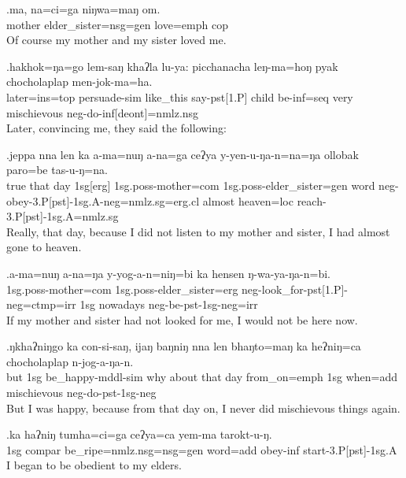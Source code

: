 \exg.ma,     na=ci=ga                 niŋwa=maŋ   om.\\
 mother elder\_sister{\sc =nsg=gen} love{\sc =emph} {\sc cop}\\
Of course my mother and my sister loved me.

\exg.hakhok=ŋa=go      lem-saŋ           khaʔla   lu-ya:  picchanacha leŋ-ma=hoŋ      pyak chocholaplap men-jok-ma=ha. \\
 later{\sc =ins=top}  persuade{\sc -sim} like\_this say{\sc -pst[1.P]} child       be{\sc -inf=seq}  very mischievous  {\sc neg-}do{\sc -inf[deont]=nmlz.nsg}\\
Later, convincing me, they said the following: 


\exg.jeppa nna  len ka       a-ma=nuŋ   a-na=ga  ceʔya y-yen-u-ŋa-n=na=ŋa   ollobak paro=be      tas-u-ŋ=na.\\
 true  that day {\sc 1sg[erg]} {\sc 1sg.poss-}mother{\sc =com} {\sc 1sg.poss-}elder\_sister{\sc =gen} word  {\sc neg-}obey{\sc -3.P[pst]-1sg.A-neg=nmlz.sg=erg.cl} almost     heaven{\sc =loc} reach{\sc -3.P[pst]-1sg.A=nmlz.sg}\\
Really, that day, because I did not listen to my mother and sister, I had almost gone to heaven. 

\exg.a-ma=nuŋ                a-na=ŋa                      y-yog-a-n=niŋ=bi                                ka  hensen   ŋ-wa-ya-ŋa-n=bi.\\
 {\sc 1sg.poss-}mother{\sc =com}  {\sc 1sg.poss-}elder\_sister{\sc =erg} {\sc neg-}look\_for{\sc -pst[1.P]-neg=ctmp=irr}  {\sc 1sg} nowadays {\sc neg-}be{\sc -pst-1sg-neg=irr}\\
If my mother and sister had not looked for me, I would not be here now.

\exg.ŋkhaʔniŋgo ka  con-si-saŋ,                    ijaŋ baŋniŋ    nna  len bhaŋto=maŋ      ka  heʔniŋ=ca        chocholaplap n-jog-a-ŋa-n.\\
 but           {\sc 1sg} be\_happy{\sc -mddl-sim} why about    that day  from\_on{\sc =emph} {\sc 1sg} when{\sc =add} mischievous  {\sc neg-}do{\sc -pst-1sg-neg}\\
But I was happy, because from that day on, I never did mischievous things again.

\exg.ka  haʔniŋ tumha=ci=ga                   ceʔya=ca        yem-ma      tarokt-u-ŋ.\\
 {\sc 1sg} {\sc compar}  be\_ripe{\sc =nmlz.nsg=nsg=gen} word{\sc =add} obey{\sc -inf} start{\sc -3.P[pst]-1sg.A}\\
I began to be obedient to my elders.

